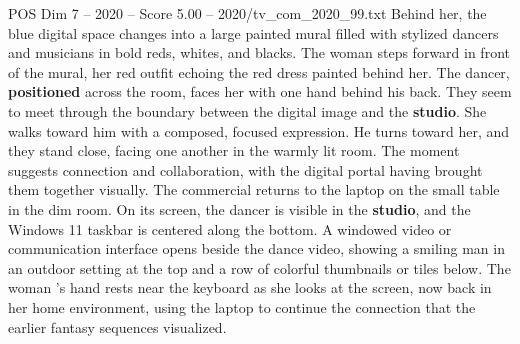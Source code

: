 \begin{textsample}{POS Dim 7 – 2020 – Score 5.00 – 2020/tv\_com\_2020\_99.txt}
Behind her, the blue digital space changes into a large painted mural filled with stylized dancers and musicians in bold reds, whites, and blacks.
The woman steps forward in front of the mural, her red outfit echoing the red dress painted behind her.
The dancer, \textbf{positioned} across the room, faces her with one hand behind his back.
They seem to meet through the boundary between the digital image and the \textbf{studio}.
She walks toward him with a composed, focused expression.
He turns toward her, and they stand close, facing one another in the warmly lit room.
The moment suggests connection and collaboration, with the digital portal having brought them together visually.
The commercial returns to the laptop on the small table in the dim room.
On its screen, the dancer is visible in the \textbf{studio}, and the Windows 11 taskbar is centered along the bottom.
A windowed video or communication interface opens beside the dance video, showing a smiling man in an outdoor setting at the top and a row of colorful thumbnails or tiles below.
The woman ’s hand rests near the keyboard as she looks at the screen, now back in her home environment, using the laptop to continue the connection that the earlier fantasy sequences visualized.

\end{textsample}
